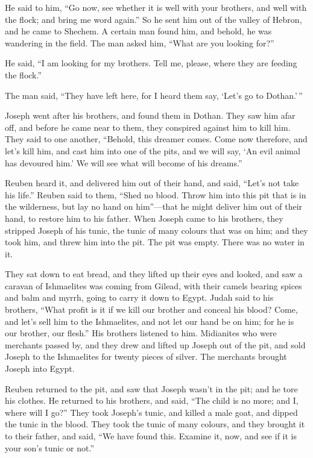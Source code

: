 He said to him, ``Go now, see whether it is well with your
brothers, and well with the flock; and bring me word again.'' So he sent
him out of the valley of Hebron, and he came to Shechem.  A
certain man found him, and behold, he was wandering in the field. The
man asked him, ``What are you looking for?''

 He said, ``I am looking for my brothers. Tell me, please,
where they are feeding the flock.''

 The man said, ``They have left here, for I heard them say,
`Let's go to Dothan.'\,''

Joseph went after his brothers, and found them in Dothan. 
They saw him afar off, and before he came near to them, they conspired
against him to kill him.  They said to one another,
``Behold, this dreamer comes.  Come now therefore, and
let's kill him, and cast him into one of the pits, and we will say, `An
evil animal has devoured him.' We will see what will become of his
dreams.''

 Reuben heard it, and delivered him out of their hand, and
said, ``Let's not take his life.''  Reuben said to them,
``Shed no blood. Throw him into this pit that is in the wilderness, but
lay no hand on him''---that he might deliver him out of their hand, to
restore him to his father.  When Joseph came to his
brothers, they stripped Joseph of his tunic, the tunic of many colours
that was on him;  and they took him, and threw him into the
pit. The pit was empty. There was no water in it.

 They sat down to eat bread, and they lifted up their eyes
and looked, and saw a caravan of Ishmaelites was coming from Gilead,
with their camels bearing spices and balm and myrrh, going to carry it
down to Egypt.  Judah said to his brothers, ``What profit
is it if we kill our brother and conceal his blood?  Come,
and let's sell him to the Ishmaelites, and not let our hand be on him;
for he is our brother, our flesh.'' His brothers listened to him.
 Midianites who were merchants passed by, and they drew and
lifted up Joseph out of the pit, and sold Joseph to the Ishmaelites for
twenty pieces of silver. The merchants brought Joseph into Egypt.

 Reuben returned to the pit, and saw that Joseph wasn't in
the pit; and he tore his clothes.  He returned to his
brothers, and said, ``The child is no more; and I, where will I go?''
 They took Joseph's tunic, and killed a male goat, and
dipped the tunic in the blood.  They took the tunic of many
colours, and they brought it to their father, and said, ``We have found
this. Examine it, now, and see if it is your son's tunic or not.''


